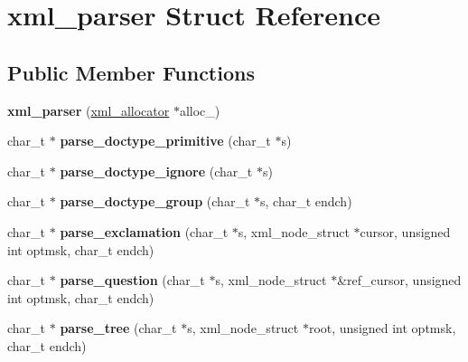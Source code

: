 \hypertarget{structxml__parser}{}\section{xml\+\_\+parser Struct Reference}
\label{structxml__parser}
\subsection*{Public Member Functions}
\begin{DoxyCompactItemize}
\item 
\mbox{\label{structxml__parser_a062d6951738847e674b538a677c8c5f0}} 
{\bfseries xml\+\_\+parser} (\hyperlink{structxml__allocator}{xml\+\_\+allocator} $\ast$alloc\+\_\+)
\item 
\mbox{\label{structxml__parser_a722853b603ad9a1d1f61bb8115bea5b4}} 
char\+\_\+t $\ast$ {\bfseries parse\+\_\+doctype\+\_\+primitive} (char\+\_\+t $\ast$s)
\item 
\mbox{\label{structxml__parser_a1e996ac9c9993f1939128859596376a1}} 
char\+\_\+t $\ast$ {\bfseries parse\+\_\+doctype\+\_\+ignore} (char\+\_\+t $\ast$s)
\item 
\mbox{\label{structxml__parser_a7804219124faeee80c00a967d16f23e3}} 
char\+\_\+t $\ast$ {\bfseries parse\+\_\+doctype\+\_\+group} (char\+\_\+t $\ast$s, char\+\_\+t endch)
\item 
\mbox{\label{structxml__parser_a40da52e4b27a0a06752930a0edf16fe9}} 
char\+\_\+t $\ast$ {\bfseries parse\+\_\+exclamation} (char\+\_\+t $\ast$s, xml\+\_\+node\+\_\+struct $\ast$cursor, unsigned int optmsk, char\+\_\+t endch)
\item 
\mbox{\label{structxml__parser_a2b0edc4fbf2ff448b4d5b31593c5c4fd}} 
char\+\_\+t $\ast$ {\bfseries parse\+\_\+question} (char\+\_\+t $\ast$s, xml\+\_\+node\+\_\+struct $\ast$\&ref\+\_\+cursor, unsigned int optmsk, char\+\_\+t endch)
\item 
\mbox{\label{structxml__parser_a96e76ebea8834b3e56e1c8646e593da4}} 
char\+\_\+t $\ast$ {\bfseries parse\+\_\+tree} (char\+\_\+t $\ast$s, xml\+\_\+node\+\_\+struct $\ast$root, unsigned int optmsk, char\+\_\+t endch)
\end{DoxyCompactItemize}
